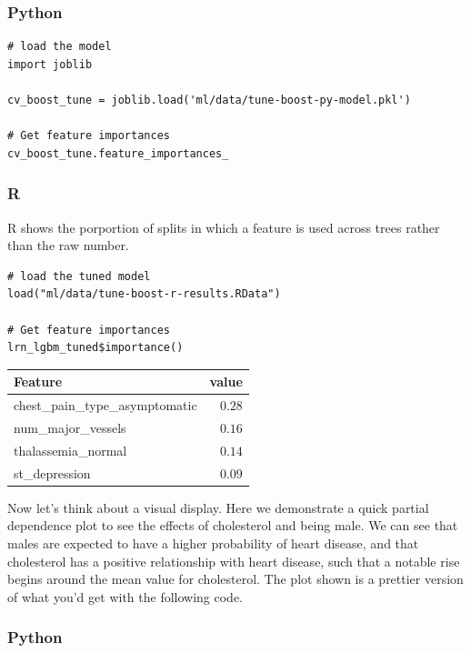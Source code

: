 \documentclass[
  letterpaper,
]{krantz}
\begin{document}
\subsubsection{Python}

\begin{verbatim}
# load the model
import joblib

cv_boost_tune = joblib.load('ml/data/tune-boost-py-model.pkl')

# Get feature importances
cv_boost_tune.feature_importances_
\end{verbatim}

\subsubsection{R}

R shows the porportion of splits in which a feature is used across trees
rather than the raw number.

\begin{verbatim}
# load the tuned model
load("ml/data/tune-boost-r-results.RData")

# Get feature importances
lrn_lgbm_tuned$importance()
\end{verbatim}

\begin{longtable*}{lr}
\toprule
Feature & value \\ 
\midrule\addlinespace[2.5pt]
chest\_pain\_type\_asymptomatic & \textcolor[HTML]{404040}{$0.28$} \\ 
num\_major\_vessels & \textcolor[HTML]{404040}{$0.16$} \\ 
thalassemia\_normal & \textcolor[HTML]{404040}{$0.14$} \\ 
st\_depression & \textcolor[HTML]{404040}{$0.09$} \\ 
\bottomrule
\end{longtable*}

Now let's think about a visual display. Here we demonstrate a quick
partial dependence plot to see the effects of cholesterol and being
male. We can see that males are expected to have a higher probability of
heart disease, and that cholesterol has a positive relationship with
heart disease, such that a notable rise begins around the mean value for
cholesterol. The plot shown is a prettier version of what you'd get with
the following code.

\subsubsection{Python}
\end{document}

